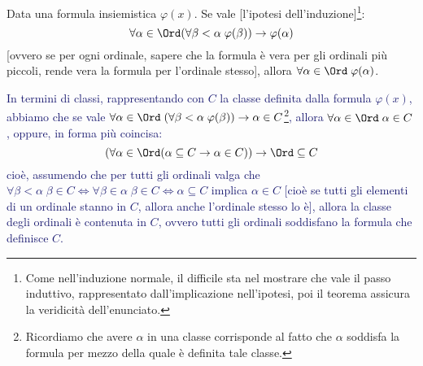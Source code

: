 \documentclass[11pt]{scrartcl}
\begin{document}
\begin{proposition}
	\label{induz_transf1}
	Data una formula insiemistica $\varphi(x)$. Se vale [l'ipotesi dell'induzione]\footnote{Come nell'induzione normale, il difficile sta nel mostrare che vale il passo induttivo, rappresentato dall'implicazione nell'ipotesi, poi il teorema assicura la veridicità dell'enunciato.}:
	\[ \forall \alpha \in \Ord(\forall \beta < \alpha \; \varphi(\beta))\rightarrow \varphi(\alpha)
		\]
	[ovvero se per ogni ordinale, sapere che la formula è vera per gli ordinali più piccoli, rende vera la formula per l'ordinale stesso], allora $\forall \alpha \in \Ord \; \varphi(\alpha)$.
\end{proposition}

\textcolor{MidnightBlue}{In termini di classi, rappresentando con $C$ la classe definita dalla formula $\varphi(x)$, abbiamo che se vale $\forall\alpha\in\Ord \;(\forall \beta < \alpha \; \varphi(\beta))\rightarrow \alpha \in C$\footnote{Ricordiamo
che avere $\alpha$ in una classe corrisponde al fatto che $\alpha$ soddisfa la formula per mezzo della quale è definita tale classe.}, allora $\forall \alpha \in \Ord \; \alpha \in C$, oppure, in forma più coincisa:
\[ (\forall \alpha \in \Ord (\alpha \subseteq C \rightarrow \alpha \in C)) \rightarrow \Ord \subseteq C
	\]
cioè, assumendo che per tutti gli ordinali valga che $\forall \beta < \alpha \; \beta \in C \iff \forall \beta \in \alpha \; \beta \in C \iff \alpha \subseteq C$ implica $\alpha \in C$ [cioè se tutti gli elementi di un ordinale stanno in $C$, allora anche l'ordinale stesso lo è], allora la classe degli ordinali è contenuta in $C$, ovvero tutti gli ordinali soddisfano la formula che definisce $C$.}
\end{document}
